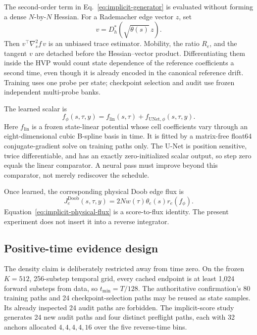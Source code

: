 \documentclass[11pt]{article}
\numberwithin{equation}{section}
\newcommand{\1}{\mathbf 1}
\begin{document}
The second-order term in Eq.~\eqref{eq:implicit-generator} is evaluated without
forming a dense \(N\)-by-\(N\) Hessian.  For a Rademacher edge vector \(z\), set
\[
  v=D_h^{\!*}\!\left(\sqrt{\theta(s)}\,z\right).
\]
Then \(v^\top\nabla_s^2f\,v\) is an unbiased trace estimator.  Mobility,
the ratio \(R_e\), and the tangent \(v\) are detached before the Hessian--vector
product.  Differentiating them inside the HVP would count state dependence of
the reference coefficients a second time, even though it is already encoded in
the canonical reference drift.  Training uses one probe per state; checkpoint
selection and audit use frozen independent multi-probe banks.

The learned scalar is
\begin{equation}\label{eq:implicit-model}
  f_{\phi}(s,\tau,y)=f_{\mathrm{lin}}(s,\tau)+
                     f_{\mathrm{UNet},\phi}(s,\tau,y).
\end{equation}
Here \(f_{\mathrm{lin}}\) is a frozen state-linear potential whose cell
coefficients vary through an eight-dimensional cubic B-spline basis in time.
It is fitted by a matrix-free float64 conjugate-gradient solve on training paths
only.  The U-Net is position sensitive, twice differentiable, and has an exactly
zero-initialized scalar output, so step zero equals the linear comparator.  A
neural pass must improve beyond this comparator, not merely rediscover the
schedule.

Once learned, the corresponding physical Doob edge flux is
\begin{equation}\label{eq:implicit-physical-flux}
  J^{\mathrm{Doob}}_e(s,\tau,y)
  =2Nw(\tau)\theta_e(s)r_e(f_{\phi}).
\end{equation}
Equation~\eqref{eq:implicit-physical-flux} is a score-to-flux identity.  The
present experiment does not insert it into a reverse integrator.

\subsection{Positive-time evidence design}

The density claim is deliberately restricted away from time zero.  On the
frozen \(K=512\), 256-substep temporal grid, every cached endpoint is at least
1,024 forward substeps from data, so \(t_{\min}=T/128\).  The authoritative
confirmation's 80 training paths and 24 checkpoint-selection paths may be
reused as state samples.  Its already inspected 24 audit paths are forbidden.
The implicit-score study generates 24 new audit paths and four distinct
preflight paths, each with 32 anchors allocated \(4,4,4,4,16\) over the five
reverse-time bins.
\end{document}
